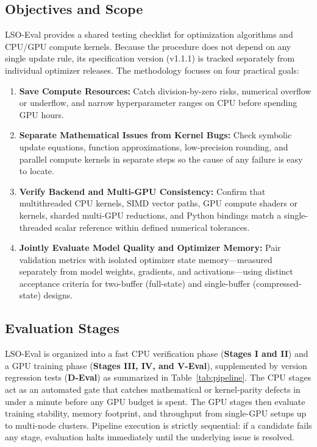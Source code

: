 \documentclass[11pt,a4paper]{article}
\renewcommand{\_}{\origunderscore\allowbreak}
\begin{document}
\subsection{Objectives and Scope}
\noindent
LSO-Eval provides a shared testing checklist for optimization algorithms and CPU/GPU compute kernels. Because the procedure does not depend on any single update rule, its specification version (v1.1.1) is tracked separately from individual optimizer releases. The methodology focuses on four practical goals:

\begin{enumerate}[leftmargin=1.8em, itemsep=0.35em]
    \item \textbf{Save Compute Resources:} Catch division-by-zero risks, numerical overflow or underflow, and narrow hyperparameter ranges on CPU before spending GPU hours.
    \item \textbf{Separate Mathematical Issues from Kernel Bugs:} Check symbolic update equations, function approximations, low-precision rounding, and parallel compute kernels in separate steps so the cause of any failure is easy to locate.
    \item \textbf{Verify Backend and Multi-GPU Consistency:} Confirm that multithreaded CPU kernels, SIMD vector paths, GPU compute shaders or kernels, sharded multi-GPU reductions, and Python bindings match a single-threaded scalar reference within defined numerical tolerances.
    \item \textbf{Jointly Evaluate Model Quality and Optimizer Memory:} Pair validation metrics with isolated optimizer state memory---measured separately from model weights, gradients, and activations---using distinct acceptance criteria for two-buffer (full-state) and single-buffer (compressed-state) designs.
\end{enumerate}

\subsection{Evaluation Stages}
\noindent
LSO-Eval is organized into a fast CPU verification phase (\textbf{Stages I and II}) and a GPU training phase (\textbf{Stages III, IV, and V-Eval}), supplemented by version regression tests (\textbf{D-Eval}) as summarized in Table~\ref{tab:pipeline}. The CPU stages act as an automated gate that catches mathematical or kernel-parity defects in under a minute before any GPU budget is spent. The GPU stages then evaluate training stability, memory footprint, and throughput from single-GPU setups up to multi-node clusters. Pipeline execution is strictly sequential: if a candidate fails any stage, evaluation halts immediately until the underlying issue is resolved.
\end{document}
